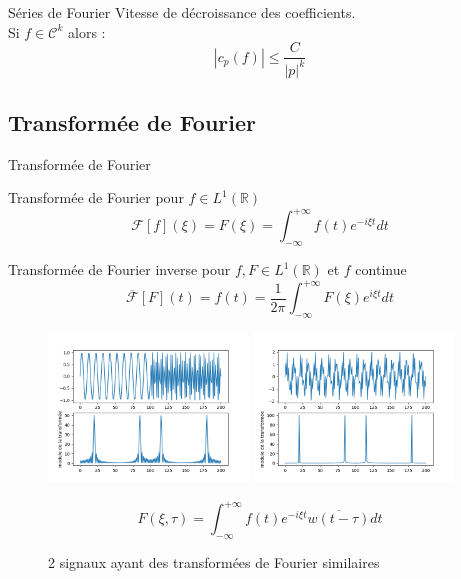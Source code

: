\documentclass[french]{beamer}
\begin{document}
\begin{frame}{Séries de Fourier}	
	Vitesse de décroissance des coefficients. \\
	
	Si $f \in \mathcal{C}^k$ alors : \\
	$$ | c_p(f) | \leqslant \frac{C}{|p|^k} $$
	
	
\end{frame}


\subsection{Transformée de Fourier}
\begin{frame}{Transformée de Fourier}
	
	Transformée de Fourier pour $f \in  L^1(\mathbb{R})$
	$$ \mathcal{F}[f](\xi) = F(\xi)= \int_{-\infty}^{+\infty}f(t)e^{-i\xi t}dt $$ 
	
	\pause
	Transformée de Fourier inverse pour $f, F \in  L^1(\mathbb{R})$ et $f$ continue
	$$ \overline{\mathcal{F}}[F](t) = f(t)=\frac{1}{{2\pi}} \int_{-\infty}^{+\infty}F(\xi)e^{i \xi t}dt $$
	
\end{frame}


\begin{frame}
	\begin{figure}[h]
		\centering
		\includegraphics[width=150pt]{successifs.png}
		\includegraphics[width=150pt]{simultanes.png}
		\caption*{2 signaux ayant des transformées de Fourier similaires}
		
		\pause	
		
		$$ F(\xi, \tau)= \int_{-\infty}^{+\infty}f(t)e^{-i \xi t} \overline{w(t - \tau)}dt$$
	\end{figure}
	
\end{frame}
\end{document}
